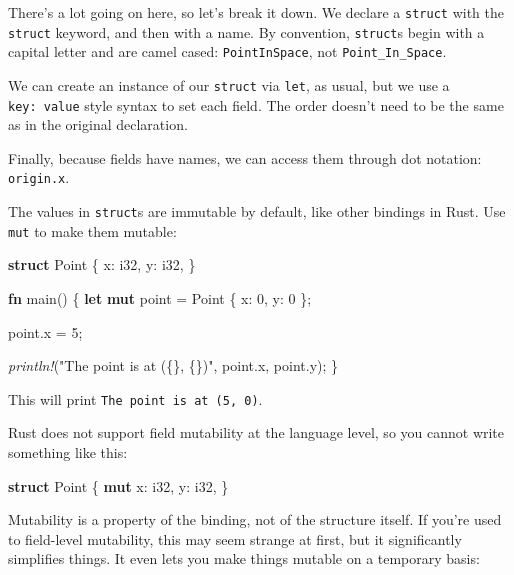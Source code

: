 \documentclass[a4paper,]{book}
\newenvironment{Shaded}{\begin{snugshade}}{\end{snugshade}}
\newcommand{\KeywordTok}[1]{\textcolor[rgb]{0.13,0.29,0.53}{\textbf{{#1}}}}
\newcommand{\DataTypeTok}[1]{\textcolor[rgb]{0.13,0.29,0.53}{{#1}}}
\newcommand{\DecValTok}[1]{\textcolor[rgb]{0.00,0.00,0.81}{{#1}}}
\newcommand{\StringTok}[1]{\textcolor[rgb]{0.31,0.60,0.02}{{#1}}}
\newcommand{\PreprocessorTok}[1]{\textcolor[rgb]{0.56,0.35,0.01}{\textit{{#1}}}}
\newcommand{\NormalTok}[1]{{#1}}
\begin{document}
There's a lot going on here, so let's break it down. We declare a
\texttt{struct} with the \texttt{struct} keyword, and then with a name.
By convention, \texttt{struct}s begin with a capital letter and are
camel cased: \texttt{PointInSpace}, not \texttt{Point\_In\_Space}.

We can create an instance of our \texttt{struct} via \texttt{let}, as
usual, but we use a \texttt{key:\ value} style syntax to set each field.
The order doesn't need to be the same as in the original declaration.

Finally, because fields have names, we can access them through dot
notation: \texttt{origin.x}.

The values in \texttt{struct}s are immutable by default, like other
bindings in Rust. Use \texttt{mut} to make them mutable:

\begin{Shaded}
\begin{Highlighting}[]
\KeywordTok{struct} \NormalTok{Point \{}
    \NormalTok{x: }\DataTypeTok{i32}\NormalTok{,}
    \NormalTok{y: }\DataTypeTok{i32}\NormalTok{,}
\NormalTok{\}}

\KeywordTok{fn} \NormalTok{main() \{}
    \KeywordTok{let} \KeywordTok{mut} \NormalTok{point = Point \{ x: }\DecValTok{0}\NormalTok{, y: }\DecValTok{0} \NormalTok{\};}

    \NormalTok{point.x = }\DecValTok{5}\NormalTok{;}

    \PreprocessorTok{println!}\NormalTok{(}\StringTok{"The point is at (\{\}, \{\})"}\NormalTok{, point.x, point.y);}
\NormalTok{\}}
\end{Highlighting}
\end{Shaded}

This will print \texttt{The\ point\ is\ at\ (5,\ 0)}.

Rust does not support field mutability at the language level, so you
cannot write something like this:

\begin{Shaded}
\begin{Highlighting}[]
\KeywordTok{struct} \NormalTok{Point \{}
    \KeywordTok{mut} \NormalTok{x: }\DataTypeTok{i32}\NormalTok{,}
    \NormalTok{y: }\DataTypeTok{i32}\NormalTok{,}
\NormalTok{\}}
\end{Highlighting}
\end{Shaded}

Mutability is a property of the binding, not of the structure itself. If
you're used to field-level mutability, this may seem strange at first,
but it significantly simplifies things. It even lets you make things
mutable on a temporary basis:
\end{document}
